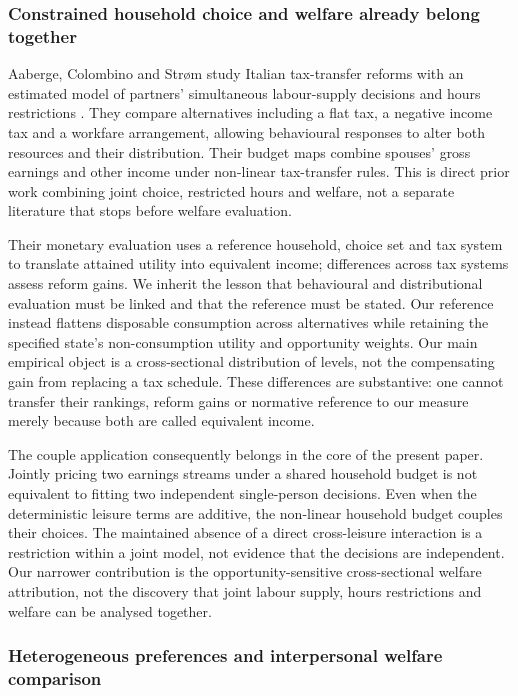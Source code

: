 \documentclass[11pt,a4paper]{article}
\begin{document}
\subsubsection{Constrained household choice and welfare already belong together}\label{constrained-household-choice-and-welfare-already-belong-together}

Aaberge, Colombino and Strøm study Italian tax-transfer reforms with an estimated model of partners' simultaneous labour-supply decisions and hours restrictions \citep[section 2 and Appendix A]{aaberge2004}. They compare alternatives including a flat tax, a negative income tax and a workfare arrangement, allowing behavioural responses to alter both resources and their distribution. Their budget maps combine spouses' gross earnings and other income under non-linear tax-transfer rules. This is direct prior work combining joint choice, restricted hours and welfare, not a separate literature that stops before welfare evaluation.

Their monetary evaluation uses a reference household, choice set and tax system to translate attained utility into equivalent income; differences across tax systems assess reform gains. We inherit the lesson that behavioural and distributional evaluation must be linked and that the reference must be stated. Our reference instead flattens disposable consumption across alternatives while retaining the specified state's non-consumption utility and opportunity weights. Our main empirical object is a cross-sectional distribution of levels, not the compensating gain from replacing a tax schedule. These differences are substantive: one cannot transfer their rankings, reform gains or normative reference to our measure merely because both are called equivalent income.

The couple application consequently belongs in the core of the present paper. Jointly pricing two earnings streams under a shared household budget is not equivalent to fitting two independent single-person decisions. Even when the deterministic leisure terms are additive, the non-linear household budget couples their choices. The maintained absence of a direct cross-leisure interaction is a restriction within a joint model, not evidence that the decisions are independent. Our narrower contribution is the opportunity-sensitive cross-sectional welfare attribution, not the discovery that joint labour supply, hours restrictions and welfare can be analysed together.

\subsubsection{Heterogeneous preferences and interpersonal welfare comparison}\label{heterogeneous-preferences-and-interpersonal-welfare-comparison}
\end{document}

